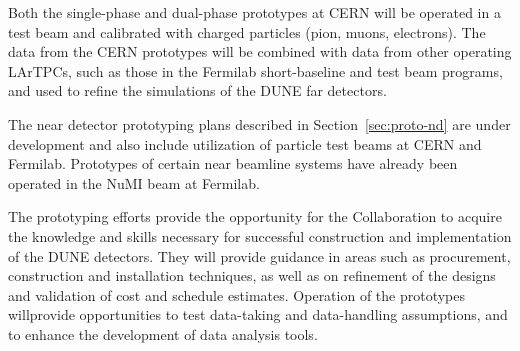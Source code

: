 Both the single-phase and dual-phase prototypes at CERN will be operated in a test beam and calibrated with charged particles (pion, muons, electrons). The data from the CERN
prototypes will be combined with data from other operating LArTPCs, such as those in the Fermilab short-baseline and test beam programs, and used to refine the simulations of the DUNE far detectors.  

The near detector prototyping plans described in Section~\ref{sec:proto-nd} are under development and also %
include utilization of particle test beams at CERN and Fermilab.  Prototypes of certain near beamline systems  have already been operated in the NuMI beam at Fermilab.

The prototyping efforts provide the opportunity for the Collaboration to acquire the knowledge and skills necessary for successful construction and implementation of the DUNE detectors. They  will provide guidance  %
 in areas such as procurement, construction and installation techniques, as well as on refinement of the designs and validation of cost and schedule estimates.  Operation of the %
prototypes willprovide  opportunities to test data-taking and data-handling assumptions, and to enhance the development of data analysis tools.  %


